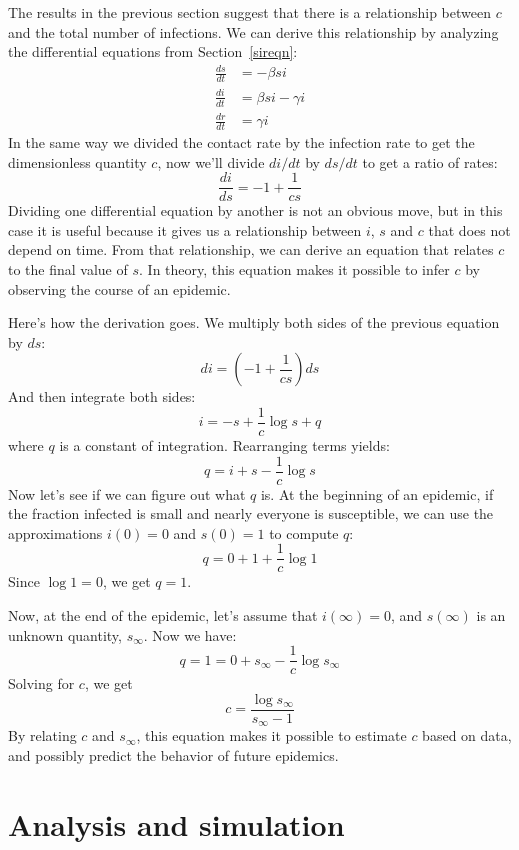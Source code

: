 \documentclass[12pt]{book}
\theoremstyle{exercise}
\begin{document}
The results in the previous section suggest that there is a relationship between $c$ and the total number of infections.  We can derive this relationship by analyzing the differential equations from Section~\ref{sireqn}:
%
\begin{align*}
\frac{ds}{dt} &= -\beta s i \\
\frac{di}{dt} &= \beta s i - \gamma i\\
\frac{dr}{dt} &= \gamma i
\end{align*}
%
In the same way we divided the contact rate by the infection rate to get the dimensionless quantity $c$, now we'll divide $di/dt$ by $ds/dt$ to get a ratio of rates:
%
\[ \frac{di}{ds} = -1 + \frac{1}{cs} \]
%
Dividing one differential equation by another is not an obvious move, but in this case it is useful because it gives us a relationship between $i$, $s$ and $c$ that does not depend on time.  From that relationship, we can derive an equation that relates $c$ to the final value of $s$.  In theory, this equation makes it possible to infer $c$ by observing the course of an epidemic.

Here's how the derivation goes.  We multiply both sides of the previous equation by $ds$:
%
\[ di = \left( -1 + \frac{1}{cs} \right) ds \]
%
And then integrate both sides:
%
\[ i = -s + \frac{1}{c} \log s + q \]
%
where $q$ is a constant of integration.  Rearranging terms yields:
%
\[ q = i + s - \frac{1}{c} \log s \]
%
Now let's see if we can figure out what $q$ is.  At the beginning of an epidemic, if the fraction infected is small and nearly everyone is susceptible, we can use the approximations $i(0) = 0$ and $s(0) = 1$ to compute $q$:
%
\[ q = 0 + 1 + \frac{1}{c} \log 1 \]
%
Since $\log 1 = 0$, we get $q = 1$.

\newcommand{\sinf}{s_{\infty}}

Now, at the end of the epidemic, let's assume that $i(\infty) = 0$, and $s(\infty)$ is an unknown quantity, $\sinf$.  Now we have:
%
\[ q = 1 = 0 + \sinf - \frac{1}{c} \log \sinf \]
%
Solving for $c$, we get
%
\[ c = \frac{\log \sinf}{\sinf - 1} \]
%
By relating $c$ and $\sinf$, this equation makes it possible to estimate $c$ based on data, and possibly predict the behavior of future epidemics.

\section{Analysis and simulation}
\end{document}
